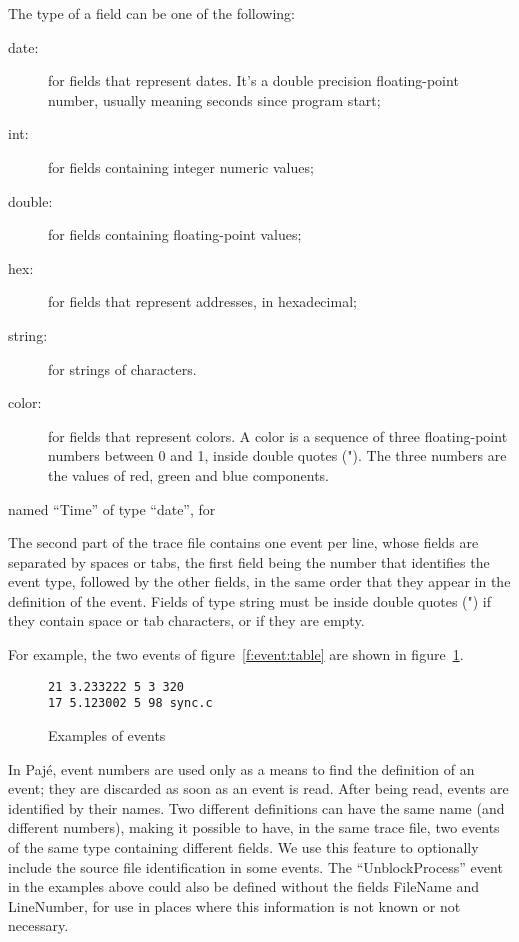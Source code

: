 The type of a field can be one of the following:
\begin{description}
  \item [date:] for fields that represent dates.
                It's a double precision floating-point number, usually meaning seconds since program start;
  \item [int:] for fields containing integer numeric values;
  \item [double:] for fields containing floating-point values;
  \item [hex:] for fields that represent addresses, in hexadecimal;
  \item [string:] for strings of characters.
  \item [color:] for fields that represent colors. A color is a sequence of
                 three floating-point numbers between 0 and 1, inside double 
                 quotes (").
                 The three numbers are the values of red, green and blue
                 components.
\end{description}

named ``Time'' of type ``date'', for

The second part of the trace file contains one event per line, whose 
fields are separated by spaces or tabs, the first field being the number that
identifies the event type, followed by the other fields, in the same order that
they appear in the
definition of the event. 
Fields of type string must be inside double quotes (") if they contain space or
tab characters, or if they are empty.

For example, the two events of figure~\ref{f:event:table} are shown in figure~\ref{f:event}.
\begin{figure}
\begin{center}
\begin{minipage}{5cm}
\begin{verbatim}
21 3.233222 5 3 320
17 5.123002 5 98 sync.c
\end{verbatim}
\end{minipage}
\end{center}
\caption{Examples of events}
\label{f:event}
\end{figure}

In Pajé, event numbers are used only as a means to find the definition
of an event; they are discarded as soon as an event is read.
After being read, events are identified by their names.
Two different definitions can have the same name (and different numbers), making it possible to have, in the same trace file, two events of the same type containing different fields.
We use this feature to optionally include the source file identification in some
events. The ``UnblockProcess'' event in the examples above could also be defined without the fields FileName and LineNumber, for use in places where this information is not known or not necessary.

